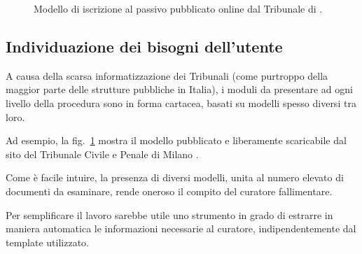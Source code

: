 \begin{figure}[h!tbp]
\centering
{}
\caption{Modello di iscrizione al passivo pubblicato online dal Tribunale di .}
\label{fig:ModelloMilano}
\end{figure}


\subsection{Individuazione dei bisogni dell’utente}
A causa della scarsa informatizzazione dei Tribunali (come purtroppo della maggior parte delle strutture pubbliche in Italia), i moduli da presentare ad ogni livello della procedura sono in forma cartacea, basati su modelli spesso diversi tra loro.

Ad esempio, la fig.~\ref{fig:ModelloMilano} mostra il modello pubblicato e liberamente scaricabile dal sito del Tribunale Civile e Penale di Milano \cite{milano:modulistica}.

Come è facile intuire, la presenza di diversi modelli, unita al numero elevato di documenti da esaminare, rende oneroso il compito del curatore fallimentare.

Per semplificare il lavoro sarebbe utile uno strumento in grado di estrarre in maniera automatica le informazioni necessarie al curatore, indipendentemente dal template utilizzato.

